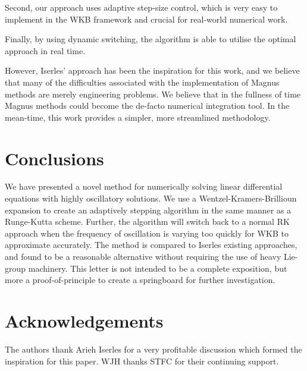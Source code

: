 Second, our approach uses adaptive step-size control, which is very easy to implement in the WKB framework and crucial for real-world numerical work.

Finally, by using dynamic switching, the algorithm is able to utilise the optimal approach in real time.

However, Iserles' approach has been the inspiration for this work, and we believe that many of the difficulties associated with the implementation of Magnus methods are merely engineering problems. We believe that in the fullness of time Magnus methods could become the de-facto numerical integration tool. In the mean-time, this work provides a simpler, more streamlined methodology.


\section{Conclusions}



We have presented a novel method for numerically solving linear differential equations with highly oscillatory solutions. We use a Wentzel-Kramers-Brillioun expansion to create an adaptively stepping algorithm in the same manner as a Runge-Kutta scheme. Further, the algorithm will switch back to a normal RK approach when the frequency of oscillation is varying too quickly for WKB to approximate accurately. The method is compared to Iserles existing approaches, and found to be a reasonable alternative without requiring the use of heavy Lie-group machinery. This letter is not intended to be a complete exposition, but more a proof-of-principle to create a springboard for further investigation.

\section*{Acknowledgements}
The authors thank Arieh Iserles for a very profitable discussion which formed the inspiration for this paper. WJH thanks STFC for their continuing support.



\begin{subappendices}
  
\end{subappendices}

